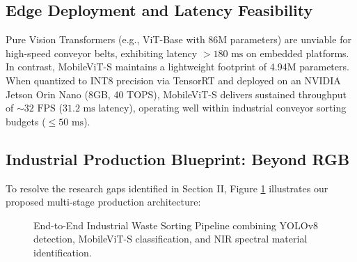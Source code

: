 \documentclass[conference]{IEEEtran}
\begin{document}
\subsection{Edge Deployment and Latency Feasibility}
Pure Vision Transformers (e.g., ViT-Base with 86M parameters) are unviable for high-speed conveyor belts, exhibiting latency $> 180\text{ ms}$ on embedded platforms. In contrast, MobileViT-S maintains a lightweight footprint of 4.94M parameters. When quantized to INT8 precision via TensorRT and deployed on an NVIDIA Jetson Orin Nano (8GB, 40 TOPS), MobileViT-S delivers sustained throughput of $\sim 32\text{ FPS}$ ($31.2\text{ ms}$ latency), operating well within industrial conveyor sorting budgets ($\le 50\text{ ms}$).

\subsection{Industrial Production Blueprint: Beyond RGB}
To resolve the research gaps identified in Section II, Figure \ref{fig:industrial_pipeline} illustrates our proposed multi-stage production architecture:

\begin{figure}[htbp]
\centering
{}
\caption{End-to-End Industrial Waste Sorting Pipeline combining YOLOv8 detection, MobileViT-S classification, and NIR spectral material identification.}
\label{fig:industrial_pipeline}
\end{figure}
\end{document}
